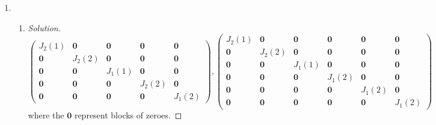 \documentclass[12pt, a4paper]{article}
\begin{document}
\begin{enumerate}
  \item
    \begin{enumerate} %
      \item
        \begin{proof}[Solution]
          \[
            \begin{pmatrix}
              J_2(1)&\mathbf{0}&\mathbf{0}&\mathbf{0}&\mathbf{0}\\
              \mathbf{0}&J_2(2)&\mathbf{0}&\mathbf{0}&\mathbf{0}\\
              \mathbf{0}&\mathbf{0}&J_1(1)&\mathbf{0}&\mathbf{0}\\
              \mathbf{0}&\mathbf{0}&\mathbf{0}&J_2(2)&\mathbf{0}\\
              \mathbf{0}&\mathbf{0}&\mathbf{0}&\mathbf{0}&J_1(2)
            \end{pmatrix},
            \begin{pmatrix}
              J_2(1)&\mathbf{0}&\mathbf{0}&\mathbf{0}&\mathbf{0}&\mathbf{0}\\
              \mathbf{0}&J_2(2)&\mathbf{0}&\mathbf{0}&\mathbf{0}&\mathbf{0}\\
              \mathbf{0}&\mathbf{0}&J_1(1)&\mathbf{0}&\mathbf{0}&\mathbf{0}\\
              \mathbf{0}&\mathbf{0}&\mathbf{0}&J_1(2)&\mathbf{0}&\mathbf{0}\\
              \mathbf{0}&\mathbf{0}&\mathbf{0}&\mathbf{0}&J_1(2)&\mathbf{0}\\
              \mathbf{0}&\mathbf{0}&\mathbf{0}&\mathbf{0}&\mathbf{0}&J_1(2)
            \end{pmatrix}
          \]
          where the $\mathbf{0}$ represent blocks of zeroes.
        \end{proof}


\end{enumerate}
\end{enumerate}
\end{document}
